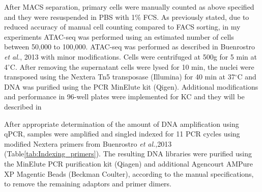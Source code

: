 After MACS separation, primary cells were manually counted as above specified and they were resuspended in PBS with 1\% FCS. As previously stated, due to reduced accuracy of manual cell counting compared to FACS sorting, in my experiments ATAC-seq was performed using an estimated number of cells between 50,000 to 100,000. ATAC-seq was performed as described in Buenrostro \textit{et al.}, 2013 with minor modifications. Cells were centrifuged at 500g for 5 min at 4{$^\circ$}C. After removing the supernatant cells were lysed for 10 min, the nuclei were transposed using the Nextera Tn5 transposase (Illumina) for 40 min at 37{$^\circ$}C and DNA was purified using the PCR MinElute kit (Qigen). Additional modifications and performance in 96-well plates were implemented for KC and they will be described in %

After appropriate determination of the amount of DNA amplification using qPCR, samples were amplified and singled indexed for 11 PCR cycles using modified Nextera primers from Buenrostro \textit{et al.},2013 (Table\ref{tab:Indexing_primers}). The resulting DNA libraries were purified using the MinElute PCR purification kit  (Qiagen) and additional Agencourt AMPure XP Magentic Beads (Beckman Coulter), according to the manual specifications, to remove the remaining adaptors and primer dimers.

